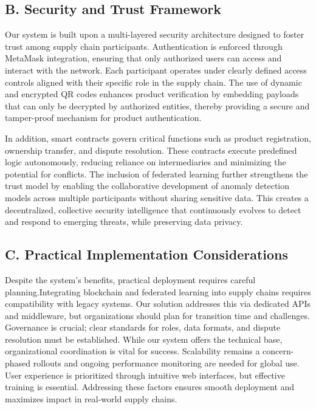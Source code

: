 \documentclass[conference]{IEEEtran}
\begin{document}
\subsection*{B. Security and Trust Framework}
Our system is built upon a multi-layered security architecture designed to foster trust among supply chain participants. Authentication is enforced through MetaMask integration, ensuring that only authorized users can access and interact with the network. Each participant operates under clearly defined access controls aligned with their specific role in the supply chain. The use of dynamic and encrypted QR codes enhances product verification by embedding payloads that can only be decrypted by authorized entities, thereby providing a secure and tamper-proof mechanism for product authentication.

In addition, smart contracts govern critical functions such as product registration, ownership transfer, and dispute resolution. These contracts execute predefined logic autonomously, reducing reliance on intermediaries and minimizing the potential for conflicts. The inclusion of federated learning further strengthens the trust model by enabling the collaborative development of anomaly detection models across multiple participants without sharing sensitive data. This creates a decentralized, collective security intelligence that continuously evolves to detect and respond to emerging threats, while preserving data privacy.

\subsection*{C. Practical Implementation Considerations}
Despite the system’s benefits, practical deployment requires careful planning.Integrating blockchain and federated learning into supply chains requires compatibility with legacy systems. Our solution addresses this via dedicated APIs and middleware, but organizations should plan for transition time and challenges. Governance is crucial; clear standards for roles, data formats, and dispute resolution must be established. While our system offers the technical base, organizational coordination is vital for success. Scalability remains a concern-phased rollouts and ongoing performance monitoring are needed for global use. User experience is prioritized through intuitive web interfaces, but effective training is essential. Addressing these factors ensures smooth deployment and maximizes impact in real-world supply chains.
\end{document}
